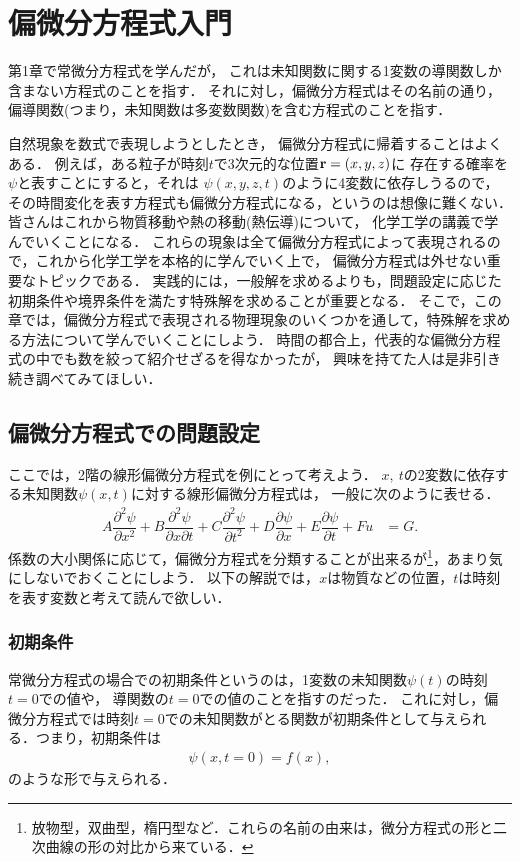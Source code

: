 \setcounter{chapter}{3}
\chapter{偏微分方程式入門}
%
第1章で常微分方程式を学んだが，
これは未知関数に関する1変数の導関数しか含まない方程式のことを指す．
それに対し，偏微分方程式はその名前の通り，
偏導関数(つまり，未知関数は多変数関数)を含む方程式のことを指す．

自然現象を数式で表現しようとしたとき，
偏微分方程式に帰着することはよくある．
例えば，ある粒子が時刻$t$で3次元的な位置${\bf r} = \left(x,y,z\right)$に
存在する確率を$\psi$と表すことにすると，それは
$\psi\left(x,y,z,t\right)$のように4変数に依存しうるので，
その時間変化を表す方程式も偏微分方程式になる，というのは想像に難くない．
皆さんはこれから物質移動や熱の移動(熱伝導)について，
化学工学の講義で学んでいくことになる．
これらの現象は全て偏微分方程式によって表現されるので，これから化学工学を本格的に学んでいく上で，
偏微分方程式は外せない重要なトピックである．
実践的には，一般解を求めるよりも，問題設定に応じた初期条件や境界条件を満たす特殊解を求めることが重要となる．
そこで，この章では，偏微分方程式で表現される物理現象のいくつかを通して，特殊解を求める方法について学んでいくことにしよう．
時間の都合上，代表的な偏微分方程式の中でも数を絞って紹介せざるを得なかったが，
興味を持てた人は是非引き続き調べてみてほしい．

%
\section{偏微分方程式での問題設定}
%
ここでは，2階の線形偏微分方程式を例にとって考えよう．
$x,~t$の2変数に依存する未知関数$\psi(x,t)$に対する線形偏微分方程式は，
一般に次のように表せる．
\begin{align}
A\dfrac{\partial^{2}\psi}{\partial x^{2}}+B\dfrac{\partial^{2}\psi}{\partial x\partial t}+C\dfrac{\partial^{2}\psi}{\partial t^{2}}+D\dfrac{\partial\psi}{\partial x}+E\dfrac{\partial\psi}{\partial t}+Fu & =G.
\end{align}
係数の大小関係に応じて，偏微分方程式を分類することが出来るが\footnote{放物型，双曲型，楕円型など．これらの名前の由来は，微分方程式の形と二次曲線の形の対比から来ている．}，あまり気にしないでおくことにしよう．
以下の解説では，$x$は物質などの位置，$t$は時刻を表す変数と考えて読んで欲しい．
%
\subsection{初期条件}
%
常微分方程式の場合での初期条件というのは，1変数の未知関数$\psi(t)$の時刻$t=0$での値や，
導関数の$t=0$での値のことを指すのだった．
これに対し，偏微分方程式では時刻$t=0$での未知関数がとる関数が初期条件として与えられる．つまり，初期条件は
%
\begin{align}
  \psi\left(x,t=0\right) = f(x),
\end{align}
のような形で与えられる．
%
